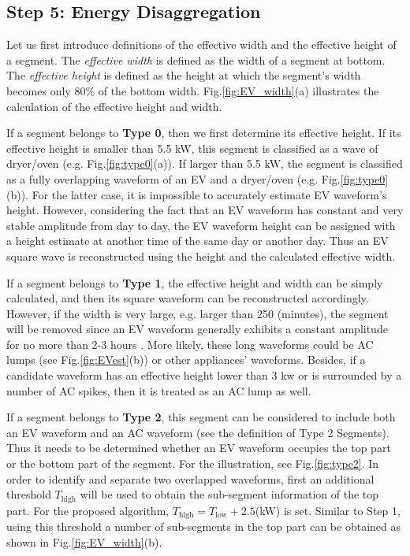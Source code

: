 \documentclass[conference]{IEEEtran}
\begin{document}
\subsection{Step 5: Energy Disaggregation}

Let us first introduce definitions of the effective width and the effective height of a segment. The \emph{effective width} is defined as the width of a segment at bottom. The \emph{effective height} is defined as the height at which the segment's width becomes only 80\% of the bottom width. Fig.\ref{fig:EV_width}(a) illustrates the calculation of the effective height and width.


If a segment belongs to \textbf{Type 0}, then we first determine its effective height. If its effective height is smaller than 5.5 kW, this segment is classified as a wave of dryer/oven (e.g. Fig.\ref{fig:type0}(a)). If larger than 5.5 kW,  the segment is classified as a fully overlapping waveform of an EV and a dryer/oven (e.g. Fig.\ref{fig:type0}(b)). For the latter case, it is impossible to accurately estimate EV waveform's height. However, considering the fact that an EV waveform has  constant and very stable amplitude from day to day, the EV waveform height can be assigned with a height estimate at another time of the same day or another day. Thus an EV square wave is reconstructed using the height and the calculated effective width.


If a segment belongs to \textbf{Type 1}, the effective height and width can be simply calculated, and then its square waveform can be reconstructed accordingly. However, if the width is very large, e.g. larger than 250 (minutes), the segment will be removed since an EV waveform generally exhibits a constant amplitude for no more than 2-3 hours \cite{PecanReportEV}. More likely, these long waveforms could be AC lumps (see Fig.\ref{fig:EVest}(b)) or other appliances' waveforms. Besides, if a candidate waveform has an effective height lower than 3 kw or is surrounded by a number of AC spikes, then it is treated as an AC lump as well.




If a segment belongs to \textbf{Type 2}, this segment can be considered to include both an EV waveform and an AC waveform (see the definition of Type 2 Segments). Thus it needs to be determined whether an EV waveform occupies the top part or the bottom part of the segment. For the illustration, see Fig.\ref{fig:type2}. In order to identify and separate two overlapped waveforms, first an additional threshold $T_{\mathrm{high}}$  will be used to obtain the sub-segment information of the top part. For the proposed algorithm, $T_{\mathrm{high}}=T_{\mathrm{low}}+2.5$(kW) is set. Similar to Step 1, using this threshold a number of sub-segments in the top part can be obtained as shown in Fig.\ref{fig:EV_width}(b).
\end{document}
